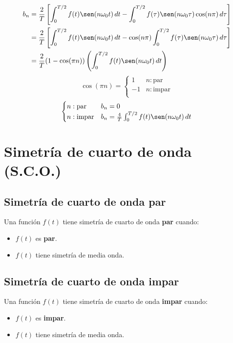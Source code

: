 \begin{equation*}
\begin{split}
    b_n
        &=\frac{2}{T}\left[
            \int_0^{T/2} f(t)\sen(n\omega_0 t)\,dt-
            \int_0^{T/2} f(\tau)\sen(n\omega_0\tau)\cos(n\pi)\,d\tau
        \right]\\
        &=\frac{2}{T}\left[
            \int_0^{T/2} f(t)\sen(n\omega_0 t)\,dt-
            \cos(n\pi)\int_0^{T/2} f(\tau)\sen(n\omega_0\tau)\,d\tau
        \right]\\
        &=\frac{2}{T}(1-\cos(\pi n))\left(
            \int_0^{T/2} f(t)\sen(n\omega_0 t)\,dt
        \right)\\
\end{split}
\end{equation*}
\begin{equation*}
    \cos(\pi n)=\begin{cases}
        1 &n: \text{par}\\
        -1 &n: \text{impar}\\
    \end{cases}
\end{equation*}
\begin{equation}
\begin{cases}
    n: \text{par}   &b_n=0\\
    n: \text{impar} &b_n=\frac{4}{T}\int_0^{T/2}f(t)\sen(n\omega_0 t)\,dt\\
\end{cases}
\end{equation}

\section{Simetría de cuarto de onda (S.C.O.)}
\subsection{Simetría de cuarto de onda par}
Una función $f(t)$ tiene simetría de cuarto de onda \textbf{par} cuando:
\begin{itemize}
    \item $f(t)$ es \textbf{par}.
    \item $f(t)$ tiene simetría de media onda.
\end{itemize}
\begin{figure}[H]
    \centering
    
\end{figure}

\subsection{Simetría de cuarto de onda impar}
Una función $f(t)$ tiene simetría de cuarto de onda \textbf{impar} cuando:
\begin{itemize}
    \item $f(t)$ es \textbf{impar}.
    \item $f(t)$ tiene simetría de media onda.
\end{itemize}
\begin{figure}[H]
    \centering
    
\end{figure}

